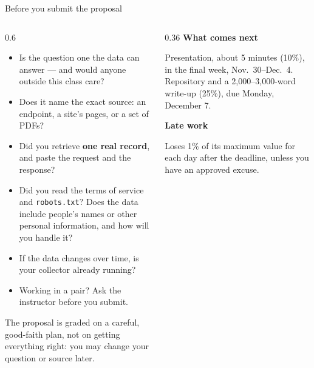 \documentclass[9pt,aspectratio=169]{beamer}
\begin{document}
\begin{frame}{Before you submit the proposal}
    \begin{columns}[T]
        \begin{column}{0.6\textwidth}
            \begin{itemize}\small
                \item[$\square$] Is the question one the data can answer --- and would anyone outside this class care?
                \item[$\square$] Does it name the exact source: an endpoint, a site's pages, or a set of PDFs?
                \item[$\square$] Did you retrieve \textbf{one real record}, and paste the request and the response?
                \item[$\square$] Did you read the terms of service and \texttt{robots.txt}? Does the data include people's names or other personal information, and how will you handle it?
                \item[$\square$] If the data changes over time, is your collector already running?
                \item[$\square$] Working in a pair? Ask the instructor before you submit.
            \end{itemize}

            \medskip
            {\small The proposal is graded on a careful, good-faith plan, not on getting everything right: you may change your question or source later.}
        \end{column}
        \begin{column}{0.36\textwidth}
            \textbf{What comes next}\\[2pt]
            {\footnotesize Presentation, about 5 minutes (10\%), in the final week, Nov.~30--Dec.~4. Repository and a 2,000--3,000-word write-up (25\%), due Monday, December 7.\par}
            \medskip
            \textbf{Late work}\\[2pt]
            {\footnotesize Loses 1\% of its maximum value for each day after the deadline, unless you have an approved excuse.\par}
        \end{column}
    \end{columns}
\end{frame}
\end{document}
